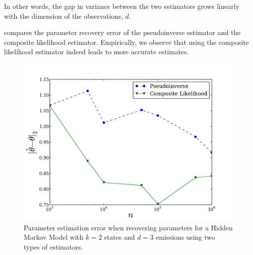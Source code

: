 In other words, the gap in variance between the two estimators
grows linearly with the dimension of the observations, $d$.

 compares the parameter recovery error of the
  pseudoinverse estimator and the composite likelihood estimator.
Empirically, we observe that using the composite likelihood estimator
indeed leads to more accurate estimates.


\begin{figure}
  \centering
  \includegraphics[width=0.8\columnwidth]{figures/hmm-2-3.pdf}
  \caption{Parameter estimation error when recovering parameters for a Hidden
  Markov Model with $k=2$ states and $d=3$ emissions using two types of estimators.}
    \label{fig:cl-hmm}
\end{figure}
